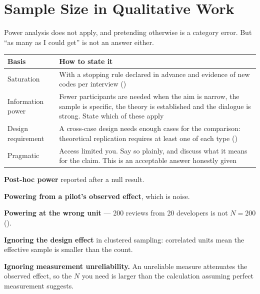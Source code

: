 \section{Sample Size in Qualitative Work}

Power analysis does not apply, and pretending otherwise is a category error.
But ``as many as I could get'' is not an answer either.

\begin{center}
\small
\begin{tabular}{@{}L{3.6cm}L{10.7cm}@{}}
\toprule
\textbf{Basis} & \textbf{How to state it} \\
\midrule
Saturation
  & With a stopping rule declared in advance and evidence of new codes per
    interview () \\
Information power
  & Fewer participants are needed when the aim is narrow, the sample is
    specific, the theory is established and the dialogue is strong. State which
    of these apply \\
Design requirement
  & A cross-case design needs enough cases for the comparison: theoretical
    replication requires at least one of each type () \\
Pragmatic
  & Access limited you. Say so plainly, and discuss what it means for the
    claim. This is an acceptable answer honestly given \\
\bottomrule
\end{tabular}
\end{center}

\begin{pitfall}
\begin{tight}
  \item \textbf{Post-hoc power} reported after a null result.
  \item \textbf{Powering from a pilot's observed effect}, which is noise.
  \item \textbf{Powering at the wrong unit} --- 200 reviews from 20 developers
    is not $N = 200$ ().
  \item \textbf{Ignoring the design effect} in clustered sampling: correlated
    units mean the effective sample is smaller than the count.
  \item \textbf{Ignoring measurement unreliability.} An unreliable measure
    attenuates the observed effect, so the $N$ you need is larger than the
    calculation assuming perfect measurement suggests.
\end{tight}
\end{pitfall}

